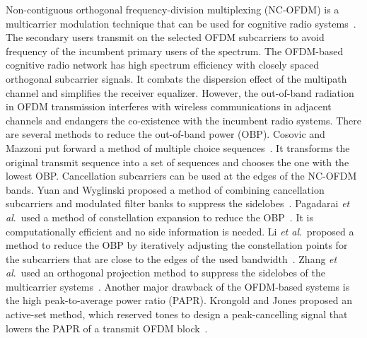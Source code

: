 \documentclass[paper]{ieice}
\begin{document}
Non-contiguous orthogonal frequency-division multiplexing (NC-OFDM) is a multicarrier modulation technique that can be used for cognitive radio systems~\cite{5783994,5669234,5497070}.  The secondary users transmit on the selected OFDM subcarriers to avoid frequency of the incumbent primary users of the spectrum.  The OFDM-based cognitive radio network has high spectrum efficiency with closely spaced orthogonal subcarrier signals.  It combats the dispersion effect of the multipath channel and simplifies the receiver equalizer.  However, the out-of-band radiation in OFDM transmission interferes with wireless communications in adjacent channels and endangers the co-existence with the incumbent radio systems.  There are several methods to reduce the out-of-band power (OBP).  Cosovic and Mazzoni put forward a method of multiple choice sequences~\cite{Supp_sidelobes_MCS}.  It transforms the original transmit sequence into a set of sequences and chooses the one with the lowest OBP.   Cancellation subcarriers can be used at the edges of the NC-OFDM bands.  Yuan and Wyglinski proposed a method of combining cancellation subcarriers and modulated filter banks to suppress the sidelobes~\cite{5424082}.  Pagadarai \emph{et al}.~used a method of constellation expansion to reduce the OBP~\cite{4489193}.  It is computationally efficient and no side information is needed.   Li \emph{et al}.~proposed a method to reduce the OBP by iteratively adjusting the constellation points for the subcarriers that are close to the edges of the used bandwidth~\cite{4939341}.  Zhang \emph{et al}.~used an orthogonal projection method to suppress the sidelobes of the multicarrier systems~\cite{6148126}. Another major drawback of the OFDM-based systems is the high peak-to-average power ratio (PAPR).  Krongold and Jones proposed an active-set method, which reserved tones to design a peak-cancelling signal that lowers the PAPR of a transmit OFDM block~\cite{krongold2004active}.  
\end{document}
